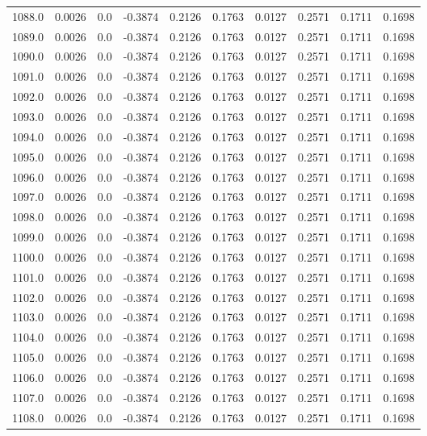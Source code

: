 \begin{longtable}{lrrrrrrrrr}
1088.0 & 0.0026 & 0.0 & -0.3874 & 0.2126 & 0.1763 & 0.0127 & 0.2571 & 0.1711 & 0.1698 \\
1089.0 & 0.0026 & 0.0 & -0.3874 & 0.2126 & 0.1763 & 0.0127 & 0.2571 & 0.1711 & 0.1698 \\
1090.0 & 0.0026 & 0.0 & -0.3874 & 0.2126 & 0.1763 & 0.0127 & 0.2571 & 0.1711 & 0.1698 \\
1091.0 & 0.0026 & 0.0 & -0.3874 & 0.2126 & 0.1763 & 0.0127 & 0.2571 & 0.1711 & 0.1698 \\
1092.0 & 0.0026 & 0.0 & -0.3874 & 0.2126 & 0.1763 & 0.0127 & 0.2571 & 0.1711 & 0.1698 \\
1093.0 & 0.0026 & 0.0 & -0.3874 & 0.2126 & 0.1763 & 0.0127 & 0.2571 & 0.1711 & 0.1698 \\
1094.0 & 0.0026 & 0.0 & -0.3874 & 0.2126 & 0.1763 & 0.0127 & 0.2571 & 0.1711 & 0.1698 \\
1095.0 & 0.0026 & 0.0 & -0.3874 & 0.2126 & 0.1763 & 0.0127 & 0.2571 & 0.1711 & 0.1698 \\
1096.0 & 0.0026 & 0.0 & -0.3874 & 0.2126 & 0.1763 & 0.0127 & 0.2571 & 0.1711 & 0.1698 \\
1097.0 & 0.0026 & 0.0 & -0.3874 & 0.2126 & 0.1763 & 0.0127 & 0.2571 & 0.1711 & 0.1698 \\
1098.0 & 0.0026 & 0.0 & -0.3874 & 0.2126 & 0.1763 & 0.0127 & 0.2571 & 0.1711 & 0.1698 \\
1099.0 & 0.0026 & 0.0 & -0.3874 & 0.2126 & 0.1763 & 0.0127 & 0.2571 & 0.1711 & 0.1698 \\
1100.0 & 0.0026 & 0.0 & -0.3874 & 0.2126 & 0.1763 & 0.0127 & 0.2571 & 0.1711 & 0.1698 \\
1101.0 & 0.0026 & 0.0 & -0.3874 & 0.2126 & 0.1763 & 0.0127 & 0.2571 & 0.1711 & 0.1698 \\
1102.0 & 0.0026 & 0.0 & -0.3874 & 0.2126 & 0.1763 & 0.0127 & 0.2571 & 0.1711 & 0.1698 \\
1103.0 & 0.0026 & 0.0 & -0.3874 & 0.2126 & 0.1763 & 0.0127 & 0.2571 & 0.1711 & 0.1698 \\
1104.0 & 0.0026 & 0.0 & -0.3874 & 0.2126 & 0.1763 & 0.0127 & 0.2571 & 0.1711 & 0.1698 \\
1105.0 & 0.0026 & 0.0 & -0.3874 & 0.2126 & 0.1763 & 0.0127 & 0.2571 & 0.1711 & 0.1698 \\
1106.0 & 0.0026 & 0.0 & -0.3874 & 0.2126 & 0.1763 & 0.0127 & 0.2571 & 0.1711 & 0.1698 \\
1107.0 & 0.0026 & 0.0 & -0.3874 & 0.2126 & 0.1763 & 0.0127 & 0.2571 & 0.1711 & 0.1698 \\
1108.0 & 0.0026 & 0.0 & -0.3874 & 0.2126 & 0.1763 & 0.0127 & 0.2571 & 0.1711 & 0.1698 \\

\end{longtable}
